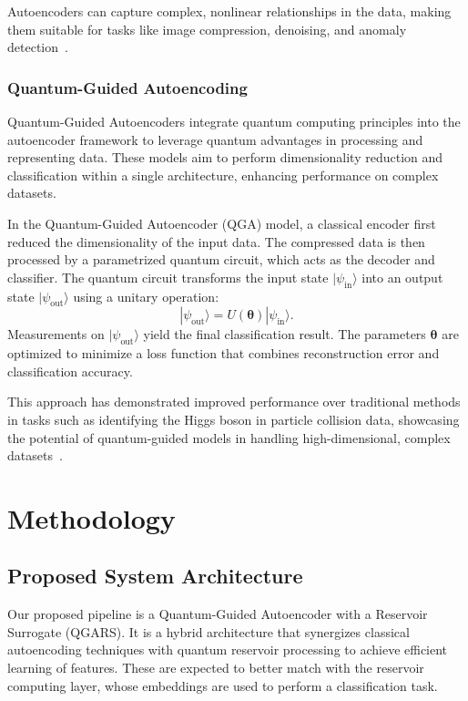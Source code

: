 \documentclass[conference]{IEEEtran}
\begin{document}
%


Autoencoders can capture complex, nonlinear 
relationships in the data, making them suitable for tasks 
like image compression, denoising, and anomaly 
detection~\cite{hintonReducingDimensionalityData2006, estevaGuideDeepLearning2019a}.

\subsubsection{Quantum-Guided Autoencoding}
Quantum-Guided Autoencoders integrate quantum computing principles into the autoencoder framework to leverage quantum advantages in processing and representing data. These models aim to perform dimensionality reduction and classification within a single architecture, enhancing performance on complex datasets.

In the Quantum-Guided Autoencoder (QGA) model, a classical encoder first reduced the dimensionality of the input data. The compressed data is then processed by a parametrized quantum circuit, which acts as the decoder and classifier. The quantum circuit transforms the input state \( |\psi_{\text{in}}\rangle \) into an output state \( |\psi_{\text{out}}\rangle \) using a unitary operation:
\begin{equation}
    |\psi_{\text{out}}\rangle = U(\bm\theta) |\psi_{\text{in}}\rangle.
\end{equation}
Measurements on \( |\psi_{\text{out}}\rangle \) yield the final classification result. The parameters \( \bm\theta \) are optimized to minimize a loss function that combines reconstruction error and classification accuracy.

This approach has demonstrated improved performance over traditional methods in tasks such as identifying the Higgs boson in particle collision data, showcasing the potential of quantum-guided models in handling high-dimensional, complex datasets~\cite{belisGuidedQuantumCompression2024}.


\section{Methodology}
\subsection{Proposed System Architecture}
Our proposed pipeline is a Quantum-Guided Autoencoder with a 
Reservoir Surrogate (QGARS). It is a hybrid architecture that 
synergizes classical autoencoding techniques with quantum reservoir processing to achieve efficient learning of features. These are expected to better match with the reservoir computing layer, whose embeddings are used to perform a classification task.
\end{document}
